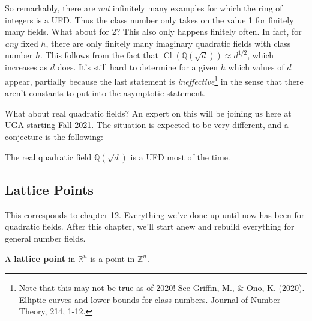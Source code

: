 \begin{remark}

So remarkably, there are \emph{not} infinitely many examples for which
the ring of integers is a UFD. Thus the class number only takes on the
value 1 for finitely many fields. What about for 2? This also only
happens finitely often. In fact, for \emph{any} fixed \(h\), there are
only finitely many imaginary quadratic fields with class number \(h\).
This follows from the fact that
\(\operatorname{Cl}({\mathbb{Q}}( \sqrt{d} )) \approx d^{1/2}\), which
increases as \(d\) does. It's still hard to determine for a given \(h\)
which values of \(d\) appear, partially because the last statement is
\emph{ineffective}\footnote{Note that this may not be true as of 2020!
  See Griffin, M., \& Ono, K. (2020). Elliptic curves and lower bounds
  for class numbers. Journal of Number Theory, 214, 1-12.} in the sense
that there aren't constants to put into the asymptotic statement.

\end{remark}

\begin{remark}

What about real quadratic fields? An expert on this will be joining us
here at UGA starting Fall 2021. The situation is expected to be very
different, and a conjecture is the following:

\end{remark}

\begin{conjecture}

The real quadratic field \({\mathbb{Q}}(\sqrt{d})\) is a UFD most of the
time.

\end{conjecture}

\hypertarget{lattice-points}{%
\subsection{Lattice Points}\label{lattice-points}}

\begin{remark}

This corresponds to chapter 12. Everything we've done up until now has
been for quadratic fields. After this chapter, we'll start anew and
rebuild everything for general number fields.

\end{remark}

\begin{definition}

A \textbf{lattice point} in \({\mathbb{R}}^n\) is a point in
\({\mathbb{Z}}^n\).

\end{definition}

